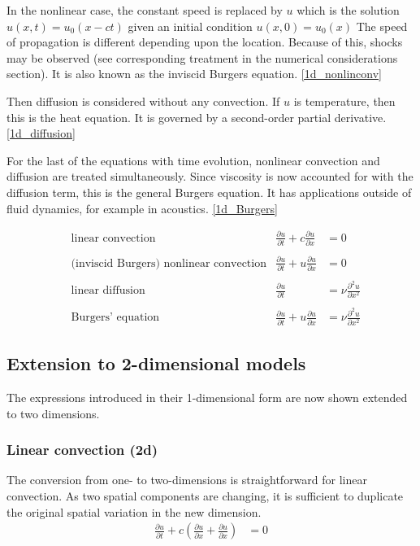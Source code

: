 \documentclass[11pt]{article}
\begin{document}
In the nonlinear case, the constant speed is replaced by $u$ which is the
solution $u(x,t)=u_0(x-ct)$ given an initial condition $u(x,0)=u_0(x)$
The speed of propagation is different depending upon the location.
Because of this, shocks may be observed (see corresponding treatment in the
numerical considerations section). It is also known as the inviscid
Burgers equation.
\ref{1d_nonlinconv}

Then diffusion is considered without any convection.
If $u$ is temperature, then this is the heat equation.
It is governed by a second-order partial derivative. \ref{1d_diffusion}

For the last of the equations with time evolution, nonlinear convection
and diffusion are treated simultaneously. Since viscosity is now accounted
for with the diffusion term, this is the general Burgers equation. It has
applications outside of fluid dynamics, for example in acoustics.
\ref{1d_Burgers}

\begin{align}
& \text{linear convection} &
\frac{\partial u}{\partial t} + c \frac{\partial u}{\partial x} &= 0		\label{1d_linconv}
\\ \nonumber \\ & \text{(inviscid Burgers) nonlinear convection} &
\frac{\partial u}{\partial t} + u \frac{\partial u}{\partial x} &= 0		\label{1d_nonlinconv}
\\ \nonumber \\ & \text{linear diffusion} &
\frac{\partial u}{\partial t} &= \nu \frac{\partial^2 u}{\partial x^2}		\label{1d_diffusion}
\\ \nonumber \\ & \text{Burgers' equation} &
\frac{\partial u}{\partial t} + u \frac{\partial u}{\partial x} &= \nu \frac{\partial^2 u}{\partial x^2}	\label{1d_Burgers}
\end{align}

\hspace{1cm}

\subsection{Extension to 2-dimensional models}
The expressions introduced in their 1-dimensional form are now shown
extended to two dimensions.
\subsubsection{Linear convection (2d)}
The conversion from one- to two-dimensions is straightforward for linear
convection. As two spatial components are changing, it is sufficient to
duplicate the original spatial variation in the new dimension.
\begin{align}
\frac{\partial u}{\partial t} + c\left(\frac{\partial u}{\partial x}  + \frac{\partial u}{\partial x} \right)
&= 0		\label{2d_linconv}
\end{align}
\end{document}
